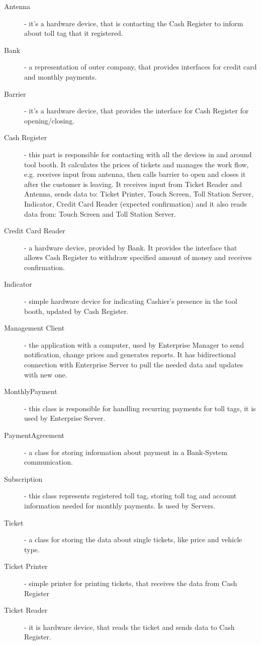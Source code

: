 \begin{description}
\item[Antenna] - it's a hardware device, that is contacting the Cash Register to inform about toll tag that it registered.
\item[Bank] - a representation of outer company, that provides interfaces for credit card and monthly payments. 
\item[Barrier] - it's a hardware device, that provides the interface for Cash Register for opening/closing.
\item[Cash Register] - this part is responsible for contacting with all the devices in and around tool booth. It calculates the prices of tickets and manages the work flow, e.g. receives input from antenna, then calls barrier to open and closes it after the customer is leaving. It receives input from Ticket Reader and Antenna, sends data to: Ticket Printer, Touch Screen, Toll Station Server, Indicator, Credit Card Reader (expected confirmation) and it also reads data from: Touch Screen and Toll Station Server.
\item[Credit Card Reader] - a hardware device, provided by Bank. It provides the interface that allows Cash Register to withdraw specified amount of money and receives confirmation.
\item[Indicator] - simple hardware device for indicating Cashier's presence in the tool booth, updated by Cash Register.
\item[Management Client] - the application with a computer, used by Enterprise Manager to send notification, change prices and generates reports. It has bidirectional connection with Enterprise Server to pull the needed data and updates with new one.
\item[MonthlyPayment] - this class is responsible for handling recurring payments for toll tags, it is used by Enterprise Server.
\item[PaymentAgreement] -  a class for storing information about payment in a Bank-System communication.
\item[Subscription] - this class represents registered toll tag, storing toll tag and account information needed for monthly payments. Is used by Servers.
\item[Ticket] - a class for storing the data about single tickets, like price and vehicle type.  
\item[Ticket Printer] - simple printer for printing tickets, that receives the data from Cash Register
\item[Ticket Reader] - it is hardware device, that reads the ticket and sends data to Cash Register.

\end{description}
